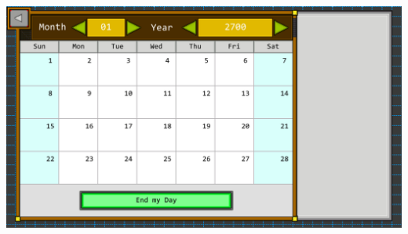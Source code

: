 \documentclass[12pt,oneside,openright,a4paper]{cpe-english-project}
\begin{document}
\begin{minipage}[c]{\textwidth}\centering
\includegraphics[width=14cm]{figure/implement-calendar.png}
\label{fig:implement-calendar}
\end{minipage}

\end{document}
